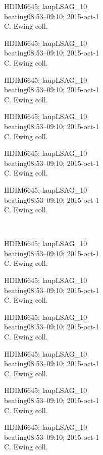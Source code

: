 \documentclass[2pt]{extarticle}
\begin{document}
\noindent
\parbox{0.16\textwidth}{\tiny \raggedright \rule[-0.3\baselineskip]{0pt}{10pt}HDIM6645; laupLSAG\_10\\ beating08:53--09:10; 2015-oct-1\\ C. Ewing coll.}
\parbox{0.16\textwidth}{\tiny \raggedright \rule[-0.3\baselineskip]{0pt}{10pt}HDIM6645; laupLSAG\_10\\ beating08:53--09:10; 2015-oct-1\\ C. Ewing coll.}
\parbox{0.16\textwidth}{\tiny \raggedright \rule[-0.3\baselineskip]{0pt}{10pt}HDIM6645; laupLSAG\_10\\ beating08:53--09:10; 2015-oct-1\\ C. Ewing coll.}
\parbox{0.16\textwidth}{\tiny \raggedright \rule[-0.3\baselineskip]{0pt}{10pt}HDIM6645; laupLSAG\_10\\ beating08:53--09:10; 2015-oct-1\\ C. Ewing coll.}
\parbox{0.16\textwidth}{\tiny \raggedright \rule[-0.3\baselineskip]{0pt}{10pt}HDIM6645; laupLSAG\_10\\ beating08:53--09:10; 2015-oct-1\\ C. Ewing coll.}
\parbox{0.16\textwidth}{\tiny \raggedright \rule[-0.3\baselineskip]{0pt}{10pt}HDIM6645; laupLSAG\_10\\ beating08:53--09:10; 2015-oct-1\\ C. Ewing coll.} \\ 
\vspace{0.001in} 

\noindent
\parbox{0.16\textwidth}{\tiny \raggedright \rule[-0.3\baselineskip]{0pt}{10pt}HDIM6645; laupLSAG\_10\\ beating08:53--09:10; 2015-oct-1\\ C. Ewing coll.}
\parbox{0.16\textwidth}{\tiny \raggedright \rule[-0.3\baselineskip]{0pt}{10pt}HDIM6645; laupLSAG\_10\\ beating08:53--09:10; 2015-oct-1\\ C. Ewing coll.}
\parbox{0.16\textwidth}{\tiny \raggedright \rule[-0.3\baselineskip]{0pt}{10pt}HDIM6645; laupLSAG\_10\\ beating08:53--09:10; 2015-oct-1\\ C. Ewing coll.}
\parbox{0.16\textwidth}{\tiny \raggedright \rule[-0.3\baselineskip]{0pt}{10pt}HDIM6645; laupLSAG\_10\\ beating08:53--09:10; 2015-oct-1\\ C. Ewing coll.}
\parbox{0.16\textwidth}{\tiny \raggedright \rule[-0.3\baselineskip]{0pt}{10pt}HDIM6645; laupLSAG\_10\\ beating08:53--09:10; 2015-oct-1\\ C. Ewing coll.}
\parbox{0.16\textwidth}{\tiny \raggedright \rule[-0.3\baselineskip]{0pt}{10pt}HDIM6645; laupLSAG\_10\\ beating08:53--09:10; 2015-oct-1\\ C. Ewing coll.} \\ 
\vspace{0.001in} 
\end{document}
